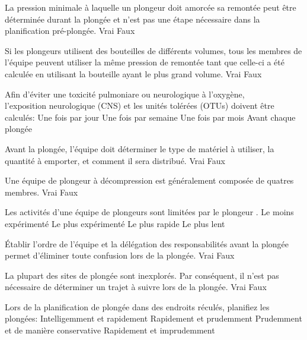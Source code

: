 \documentclass[english,12pt,a4paper]{article}
\begin{document}
\begin{outline}
		\1 La pression minimale à laquelle un plongeur doit amorcée sa remontée peut être déterminée durant la plongée et n'est pas une étape nécessaire dans la planification pré-plongée.
			\2 Vrai
			\2 Faux

		\1 Si les plongeurs utilisent des bouteilles de différents volumes, tous les membres de l'équipe peuvent utiliser la même pression de remontée tant que celle-ci a été calculée en utilisant la bouteille ayant le plus grand volume.
			\2 Vrai
			\2 Faux

		\1 Afin d'éviter une toxicité pulmoniare ou neurologique à l'oxygène,\\l'exposition neurologique (CNS) et les unités tolérées (OTUs) doivent être calculés:
			\2 Une fois par jour
			\2 Une fois par semaine
			\2 Une fois par mois
			\2 Avant chaque plongée

		\1 Avant la plongée, l'équipe doit déterminer le type de matériel à utiliser, la quantité à emporter, et comment il sera distribué.
			\2 Vrai
			\2 Faux

		\1 Une équipe de plongeur à décompression est généralement composée de quatres membres.
			\2 Vrai
			\2 Faux

		\1 Les activités d'une équipe de plongeurs sont limitées par le plongeur \underline{\hspace{1.5cm}}.
			\2 Le moins expérimenté
			\2 Le plus expérimenté
			\2 Le plus rapide
			\2 Le plus lent

		\1 Établir l'ordre de l'équipe et la délégation des responsabilités avant la plongée permet d'éliminer toute confusion lors de la plongée.
			\2 Vrai
			\2 Faux

		\1 La plupart des sites de plongée sont inexplorés. Par conséquent, il n'est pas nécessaire de déterminer un trajet à suivre lors de la plongée.
			\2 Vrai
			\2 Faux

		\1 Lors de la planification de plongée dans des endroits réculés, planifiez les plongées:
			\2 Intelligemment et rapidement
			\2 Rapidement et prudemment
			\2 Prudemment et de manière conservative
			\2 Rapidement et imprudemment
	\end{outline}
	\pagebreak

\end{document}
